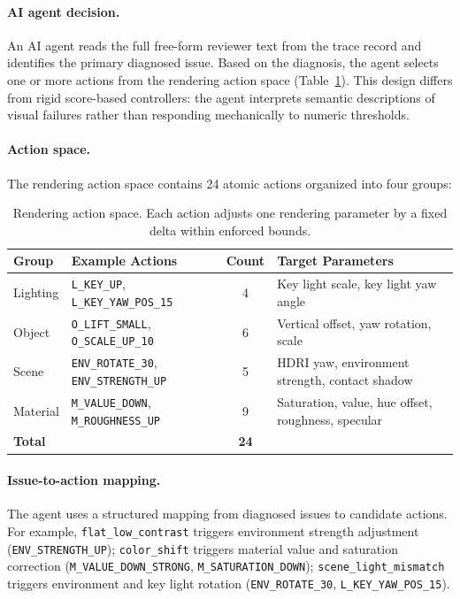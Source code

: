 \paragraph{AI agent decision.}
An AI agent reads the full free-form reviewer text from the trace record
and identifies the primary diagnosed issue.
Based on the diagnosis, the agent selects one or more actions from the rendering action space
(Table~\ref{tab:action_space}).
This design differs from rigid score-based controllers:
the agent interprets semantic descriptions of visual failures
rather than responding mechanically to numeric thresholds.

\paragraph{Action space.}
The rendering action space contains 24 atomic actions organized into four groups:

\begin{table}[h]
\caption{Rendering action space. Each action adjusts one rendering parameter
by a fixed delta within enforced bounds.}
\label{tab:action_space}
\centering
\begin{tabular}{llcp{5.5cm}}
\toprule
Group & Example Actions & Count & Target Parameters \\
\midrule
Lighting & \texttt{L\_KEY\_UP}, \texttt{L\_KEY\_YAW\_POS\_15} & 4 &
  Key light scale, key light yaw angle \\
Object & \texttt{O\_LIFT\_SMALL}, \texttt{O\_SCALE\_UP\_10} & 6 &
  Vertical offset, yaw rotation, scale \\
Scene & \texttt{ENV\_ROTATE\_30}, \texttt{ENV\_STRENGTH\_UP} & 5 &
  HDRI yaw, environment strength, contact shadow \\
Material & \texttt{M\_VALUE\_DOWN}, \texttt{M\_ROUGHNESS\_UP} & 9 &
  Saturation, value, hue offset, roughness, specular \\
\midrule
\textbf{Total} & & \textbf{24} & \\
\bottomrule
\end{tabular}
\end{table}

\paragraph{Issue-to-action mapping.}
The agent uses a structured mapping from diagnosed issues to candidate actions.
For example, \texttt{flat\_low\_contrast} triggers environment strength adjustment (\texttt{ENV\_STRENGTH\_UP});
\texttt{color\_shift} triggers material value and saturation correction
(\texttt{M\_VALUE\_DOWN\_STRONG}, \texttt{M\_SATURATION\_DOWN});
\texttt{scene\_light\_mismatch} triggers environment and key light rotation
(\texttt{ENV\_ROTATE\_30}, \texttt{L\_KEY\_YAW\_POS\_15}).


